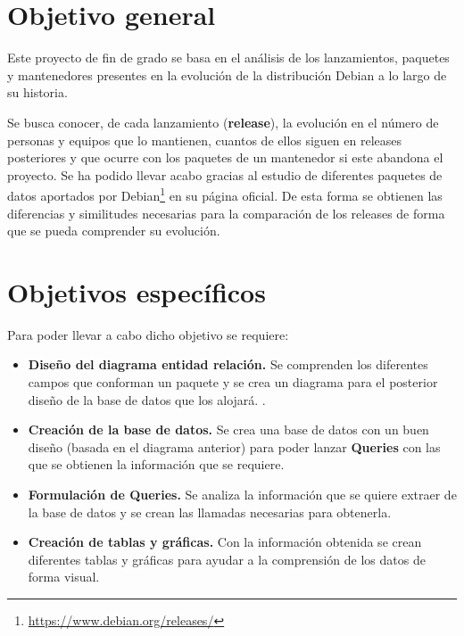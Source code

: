 \documentclass[a4paper, 12pt]{book}
\begin{document}
\section{Objetivo general} %
\label{sec:objetivo-general} %

Este proyecto de fin de grado se basa en el análisis de los lanzamientos, paquetes y mantenedores presentes en la evolución de la distribución Debian a lo largo de su historia. 

Se busca conocer, de cada lanzamiento (\textbf{release}), la evolución en el número de personas y equipos que lo mantienen,  cuantos de ellos siguen en releases posteriores y que ocurre con los paquetes de un mantenedor si este abandona el proyecto. Se ha podido llevar acabo gracias al estudio de diferentes paquetes de datos aportados por Debian\footnote{\url{https://www.debian.org/releases/}} en su página oficial.
De esta forma se obtienen las diferencias y similitudes necesarias para la comparación de los releases de forma que se pueda comprender su evolución.


\section{Objetivos específicos}
\label{sec:objetivos-especificos}

Para poder llevar a cabo dicho objetivo se requiere: 

\begin{itemize}
	\item \textbf {Diseño del diagrama entidad relación.} Se comprenden los diferentes campos que conforman un paquete y se crea un diagrama para el posterior diseño de la base de datos que los alojará.
	.
	\item \textbf {Creación de la base de datos.} Se crea una base de datos con un buen diseño (basada en el diagrama anterior) para poder lanzar \textbf {Queries} con las que se obtienen la información que se requiere.
	
	\item \textbf {Formulación de Queries.} Se analiza la información que se quiere extraer de la base de datos y se crean las llamadas necesarias para obtenerla.
	
	
	\item \textbf {Creación de tablas y gráficas.} Con la información obtenida se crean diferentes tablas y gráficas para ayudar a la comprensión de los datos de forma visual.
\end{itemize}
\end{document}
